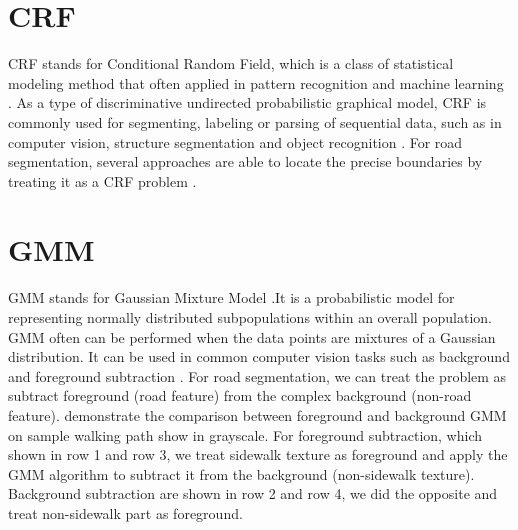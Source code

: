 \section{\ac{CRF}}
\ac{CRF} stands for Conditional Random Field, which is a class of statistical modeling method that often applied in pattern recognition and machine learning \cite{MAL-013}. As a type of discriminative undirected probabilistic graphical model, \ac{CRF} is commonly used for segmenting, labeling or parsing of sequential data, such as in computer vision, structure segmentation and object recognition \cite{RuizSarmiento2015UPGMppA, 1315232, lafferty2001conditional}. For road segmentation, several approaches are able to locate the precise boundaries by treating it as a \ac{CRF} problem \cite{ActiveContou09, Achanta:149300}. 


\section{\ac{GMM}}

\ac{GMM} stands for Gaussian Mixture Model \cite{sridharan2014gaussian}.It is a probabilistic model for representing normally distributed subpopulations within an overall population. \ac{GMM} often can be performed when the data points are mixtures of a Gaussian distribution. It can be used in common computer vision tasks such as background and foreground subtraction \cite{1333992}. For road segmentation, we can treat the problem as subtract foreground (road feature) from the complex background (non-road feature).  demonstrate the comparison between foreground and background \ac{GMM} on sample walking path show in grayscale. For foreground subtraction, which shown in row 1 and row 3, we treat sidewalk texture as foreground and apply the \ac{GMM} algorithm to subtract it from the background (non-sidewalk texture). Background subtraction are shown in row 2 and row 4, we did the opposite and treat non-sidewalk part as foreground. 

